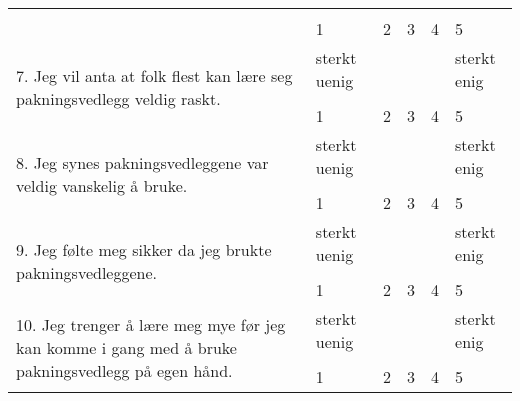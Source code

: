 \begin{longtable}{  p{7cm} p{0.7cm} p{0.7cm} p{0.7cm} p{0.7cm} p{0.7cm}}
     & \multicolumn{1}{|c}{} & \multicolumn{1}{|c}{} & \multicolumn{1}{|c}{} & \multicolumn{1}{|c}{} & \multicolumn{1}{|c|}{} \\ \cline{2-6}
     & 1 & 2 & 3 & 4 & 5 \\ 
    \multirow{3}{6cm}{7. Jeg vil anta at folk flest kan lære seg pakningsvedlegg veldig raskt.} & sterkt uenig & & & & sterkt enig \\ \cline{2-6}
     & \multicolumn{1}{|c}{} & \multicolumn{1}{|c}{} & \multicolumn{1}{|c}{} & \multicolumn{1}{|c}{} & \multicolumn{1}{|c|}{} \\ \cline{2-6}
     & 1 & 2 & 3 & 4 & 5 \\ 
    \multirow{3}{6cm}{8. Jeg synes pakningsvedleggene var veldig vanskelig å bruke.} & sterkt uenig & & & & sterkt enig \\ \cline{2-6}
     & \multicolumn{1}{|c}{} & \multicolumn{1}{|c}{} & \multicolumn{1}{|c}{} & \multicolumn{1}{|c}{} & \multicolumn{1}{|c|}{} \\ \cline{2-6}
     & 1 & 2 & 3 & 4 & 5 \\ 
    \multirow{3}{6cm}{9. Jeg følte meg sikker da jeg brukte pakningsvedleggene. } & sterkt uenig & & & & sterkt enig \\ \cline{2-6}
     & \multicolumn{1}{|c}{} & \multicolumn{1}{|c}{} & \multicolumn{1}{|c}{} & \multicolumn{1}{|c}{} & \multicolumn{1}{|c|}{} \\ \cline{2-6}
     & 1 & 2 & 3 & 4 & 5 \\ 
    \multirow{3}{6cm}{10. Jeg trenger å lære meg mye før jeg kan komme i gang med å bruke pakningsvedlegg på egen hånd.} & sterkt uenig & & & & sterkt enig \\ \cline{2-6}
     & \multicolumn{1}{|c}{} & \multicolumn{1}{|c}{} & \multicolumn{1}{|c}{} & \multicolumn{1}{|c}{} & \multicolumn{1}{|c|}{} \\ \cline{2-6}
     & 1 & 2 & 3 & 4 & 5 \\ 
\end{longtable}